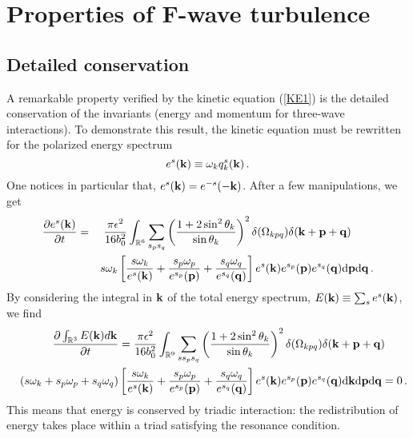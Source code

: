 \documentclass{jpp}
\def\be{\begin{equation}}
\def\ee{\end{equation}}
\def\ba{\begin{eqnarray}}
\def\ea{\end{eqnarray}}
\def\kk{{\bf k}}
\def\pp{{\bf p}}
\def\qq{{\bf q}}
\def\dd{\mathrm{d}}
\def\RR{{\mathbb{R}}}
\begin{document}
\section{Properties of F-wave turbulence}\label{Sec4}
\subsection{Detailed conservation}
A remarkable property verified by the kinetic equation (\ref{KE1}) is the detailed conservation of the invariants (energy and momentum for three-wave interactions). To demonstrate this result, the kinetic equation must be rewritten for the polarized energy spectrum
\be
e^s(\kk) \equiv \omega_{k} q^{s}_{k}(\kk) \, .
\ee
One notices in particular that, $e^s(\kk)=e^{-s}(-\kk)$. After a few manipulations, we get
\ba
\frac{\partial e^s(\kk)}{\partial t} &=& 
\frac{\pi \epsilon^{2}}{16 b_0^2} \int_{\RR^{6}} \sum_{s_{p} s_{q}}  \left(\frac{1 + 2 \sin^2 \theta_k}{\sin \theta_k}\right)^2
\delta(\Omega_{kpq}) \delta(\kk+\pp+\qq) \quad \quad \label{KE2} \\
&& s \omega_{k} 
\left[ \frac{s\omega_{k}}{e^s(\kk)} + \frac{s_{p} \omega_{p}}{e^{s_{p}}(\pp)} + \frac{s_{q} \omega_{q}}{e^{s_{q}}(\qq)} \right] 
e^{s}(\kk) e^{s_{p}}(\pp) e^{s_{q}}(\qq) \dd \pp \dd \qq \, . \nonumber 
\ea
By considering the integral in $\kk$ of the total energy spectrum, $E(\kk) \equiv \sum_s e^s(\kk)$, we find
\ba
&&\frac{\partial \int_{\RR^{3}} E(\kk) d\kk}{\partial t} = 
\frac{\pi \epsilon^{2}}{16 b_0^2} \int_{\RR^{9}} \sum_{s s_{p} s_{q}}  \left(\frac{1 + 2 \sin^2 \theta_k}{\sin \theta_k}\right)^2
\delta(\Omega_{kpq}) \delta(\kk+\pp+\qq) \quad \quad \label{KE3}  \\
&& (s \omega_k +s_p \omega_p +s_q \omega_q) 
\left[ \frac{s\omega_{k}}{e^s(\kk)} + \frac{s_{p} \omega_{p}}{e^{s_{p}}(\pp)} + \frac{s_{q} \omega_{q}}{e^{s_{q}}(\qq)} \right] 
e^{s}(\kk) e^{s_{p}}(\pp) e^{s_{q}}(\qq) \dd \kk \dd \pp \dd \qq = 0 \, .  \nonumber
\ea
This means that energy is conserved by triadic interaction: the redistribution of energy takes place within a triad satisfying the resonance condition. 
\end{document}
